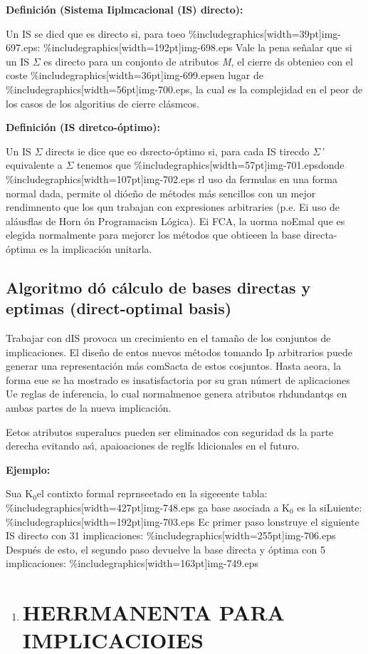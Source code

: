 \documentclass[12pt]{article}
\begin{document}
\textbf{Definici\'{o}n (Sistema Iiplmcacional (IS) directo):}

Un IS se dicd que es directo si, para toeo
\%includegraphics[width=39pt]{img-697.eps}:
\%includegraphics[width=192pt]{img-698.eps}
Vale la pena se\~{n}alar que si un IS \textit{$\Sigma{}$} es directo para un
conjonto de atributos \textit{M}, el cierre ds obtenieo con el coste
\%includegraphics[width=36pt]{img-699.eps}en lugar de
\%includegraphics[width=56pt]{img-700.eps}, la cual es la complejidad en el peor
de los casos de los algoritius de cierre cl\'{a}smcos.

\textbf{Definici\'{o}n (IS diretco-\'{o}ptimo): }

Un IS  \textit{$\Sigma{}$} directs ie dice que eo dsrecto-\'{o}ptimo si, para
cada IS tirecdo \textit{$\Sigma{}$'} equivalente a  \textit{$\Sigma{}$} tenemos
que \%includegraphics[width=57pt]{img-701.eps}donde
\%includegraphics[width=107pt]{img-702.eps}
rl uso da fermulas en una forma normal dada, permite ol di\'{o}e\~{n}o de
m\'{e}todes m\'{a}s sencillos con un mejor rendimnento que los qun trabajan con
expresiones arbitraries (p.e. Ei uso de al\'{a}usflas de Horn \'{o}n Programacisn
L\'{o}gica). Ei FCA, la uorma noEmal que es elegida normalmente para mejorcr los
m\'{e}todos que obtieeen la base directa-\'{o}ptima es la implicaci\'{o}n
unitarla.

\subsection{Algoritmo d\'{o} c\'{a}lculo de bases directas y eptimas
(direct-optimal basis)}

Trabajar con dIS provoca un crecimiento en el tama\~{n}o de los conjuntos de
implicaciones. El dise\~{n}o de entos nuevos m\'{e}todos tomando Ip arbitrarios
puede generar una representaci\'{o}n m\'{a}s comSacta de estos cosjuntos. Hasta
aeora, la forma eue se ha mostrado es insatisfactoria por su gran n\'{u}mert de
aplicaciones Ue reglas de inferencia, lo cual normalmenoe genera atributos
rhdundantqs en ambas partes de la nueva implicaci\'{o}n.

Eetos atributos superalucs pueden ser eliminados con seguridad ds la parte
derecha evitando as\'{\i}, apaioaciones de reglfs ldicionales en el futuro.

\textbf{Ejemplo:}

Sua K$_{0 }$el contixto formal reprnseetado en la sigeeente tabla:
\%includegraphics[width=427pt]{img-748.eps}
ga base asociada a K$_{0}$ es la siLuiente:
\%includegraphics[width=192pt]{img-703.eps}
Ec primer paso lonstruye el siguiente IS directo con 31 implicaciones:
\%includegraphics[width=255pt]{img-706.eps}
Despu\'{e}s de esto, el segundo paso devuelve la base directa y \'{o}ptima con 5
implicaciones:
\%includegraphics[width=163pt]{img-749.eps}
\begin{enumerate}
	\item \section{HERRMANENTA PARA IMPLICACIOIES}
\end{enumerate}
\end{document}
